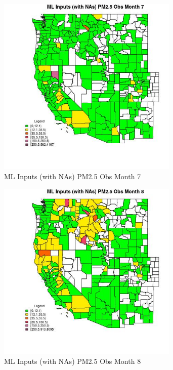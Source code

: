 \begin{figure} 
\centering  
\includegraphics[width=0.77\textwidth]{Code_Outputs/Report_ML_input_PM25_Step4_part_f_de_duplicated_aves_prioritize_24hr_obswNAs_CountyPM25_ObsmedianMonth7.jpg} 
\caption{\label{fig:Report_ML_input_PM25_Step4_part_f_de_duplicated_aves_prioritize_24hr_obswNAsCountyPM25_ObsmedianMonth7}ML Inputs (with NAs) PM2.5 Obs Month 7} 
\end{figure} 
 

\begin{figure} 
\centering  
\includegraphics[width=0.77\textwidth]{Code_Outputs/Report_ML_input_PM25_Step4_part_f_de_duplicated_aves_prioritize_24hr_obswNAs_CountyPM25_ObsmedianMonth8.jpg} 
\caption{\label{fig:Report_ML_input_PM25_Step4_part_f_de_duplicated_aves_prioritize_24hr_obswNAsCountyPM25_ObsmedianMonth8}ML Inputs (with NAs) PM2.5 Obs Month 8} 
\end{figure} 
 

